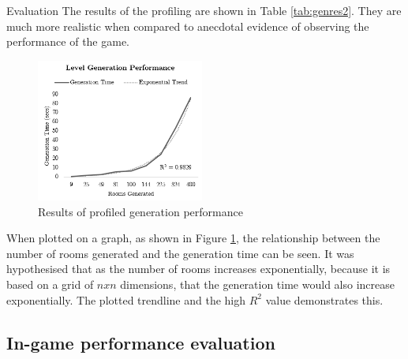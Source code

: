 \documentclass[final]{cmpreport}
\begin{document}
\begin{section}{Evaluation}
The results of the profiling are shown in Table \ref{tab:genres2}. They are much more realistic when compared to anecdotal evidence of observing the performance of the game.

\begin{figure}
    \centering
    \includegraphics[width=0.49\textwidth]{img/genperftable.png}
    \caption{Results of profiled generation performance}
    \label{fig:genperftable}
\end{figure}

When plotted on a graph, as shown in Figure \ref{fig:genperftable}, the relationship between the number of rooms generated and the generation time can be seen. It was hypothesised that as the number of rooms increases exponentially, because it is based on a grid of $n x n$ dimensions, that the generation time would also increase exponentially. The plotted trendline and the high $R^2$ value demonstrates this. 

\subsection{In-game performance evaluation}



\end{section}





\newpage

\appendix
\end{document}
